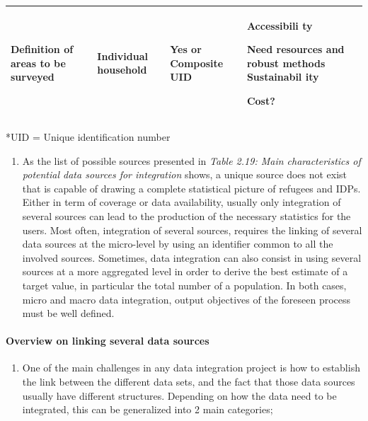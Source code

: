 \documentclass[
]{article}
\providecommand{\tightlist}{%
  \setlength{\itemsep}{0pt}\setlength{\parskip}{0pt}}
\begin{document}
\begin{longtable}[]{@{}lllll@{}}
\begin{minipage}[t]{0.17\columnwidth}
Definition
of areas to
be surveyed\strut
\end{minipage} & \begin{minipage}[t]{0.17\columnwidth}\raggedright
Individual
household\strut
\end{minipage} & \begin{minipage}[t]{0.17\columnwidth}\raggedright
Yes or
Composite
UID\strut
\end{minipage} & \begin{minipage}[t]{0.17\columnwidth}\raggedright
Accessibili
ty

Need
resources
and robust
methods
Sustainabil
ity

Cost?\strut
\end{minipage}\tabularnewline
\bottomrule
\end{longtable}

*UID = Unique identification number

\begin{enumerate}
\def\labelenumi{\arabic{enumi}.}
\setcounter{enumi}{215}
\tightlist
\item
  As the list of possible sources presented in \emph{Table 2.19: Main
  characteristics of potential data sources for integration} shows, a
  unique source does not exist that is capable of drawing a complete
  statistical picture of refugees and IDPs. Either in term of coverage
  or data availability, usually only integration of several sources
  can lead to the production of the necessary statistics for the
  users. Most often, integration of several sources, requires the
  linking of several data sources at the micro-level by using an
  identifier common to all the involved sources. Sometimes, data
  integration can also consist in using several sources at a more
  aggregated level in order to derive the best estimate of a target
  value, in particular the total number of a population. In both
  cases, micro and macro data integration, output objectives of the
  foreseen process must be well defined.
\end{enumerate}

\hypertarget{d.4.-overview-on-linking-several-data-sources}{%
\paragraph{Overview on linking several data sources}\label{d.4.-overview-on-linking-several-data-sources}}

\begin{enumerate}
\def\labelenumi{\arabic{enumi}.}
\setcounter{enumi}{216}
\tightlist
\item
  One of the main challenges in any data integration project is how
  to establish the link between the different data sets, and the fact
  that those data sources usually have different structures. Depending
  on how the data need to be integrated, this can be generalized into
  2 main categories;
\end{enumerate}
\end{document}
